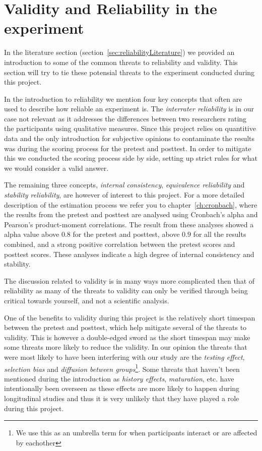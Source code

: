 \section{Validity and Reliability in the experiment}
	In the literature section (section~\ref{sec:reliabilityLiterature}) we provided an introduction to some of the common threats to reliability and validity. This section will try to tie these potensial threats to the experiment conducted during this project.
	
	\bigskip\noindent
	In the introduction to reliability we mention four key concepts that often are used to describe how reliable an experiment is. The \textit{interrater reliability} is in our case not relevant as it addresses the differences between two researchers rating the participants using qualitative measures. Since this project relies on quantitive data and the only introduction for subjective opinions to contaminate the results was during the scoring process for the pretest and posttest. In order to mitigate this we conducted the scoring process side by side, setting up strict rules for what we would consider a valid answer.%
	
	\bigskip\noindent
	The remaining three concepts, \textit{internal consistency}, \textit{equivalence reliability} and \textit{stability reliability}, are however of interest to this project. 
	For a more detailed description of the estimation process we refer you to chapter~\ref{ch:cronbach}, where the results from the pretest and posttest are analysed using Cronbach's alpha and Pearson's product-moment correlations. The result from these analyses showed a alpha value above $0.8$ for the pretest and posttest, above $0.9$ for all the results combined, and a strong positive correlation between the pretest scores and posttest scores. These analyses indicate a high degree of internal consistency and stability.
	
	\bigskip\noindent
	The discussion related to validity is in many ways more complicated then that of reliability as many of the threats to validity can only be verified through being critical towards yourself, and not a scientific analysis. 
	
	\bigskip\noindent
	One of the benefits to validity during this project is the relatively short timespan between the pretest and posttest, which help mitigate several of the threats to validity. This is however a double-edged sword as the short timespan may make some threats more likely to reduce the validity. In our opinion the threats that were most likely to have been interfering with our study are the \textit{testing effect}, \textit{selection bias} and \textit{diffusion between groups}\footnote{We use this as an umbrella term for when participants interact or are affected by eachother}. 
	Some threats that haven't been mentioned during the introduction as \textit{history effects}, \textit{maturation}, etc. have intentionally been overseen as these effects are more likely to happen during longitudinal studies and thus it is very unlikely that they have played a role during this project. 
	
